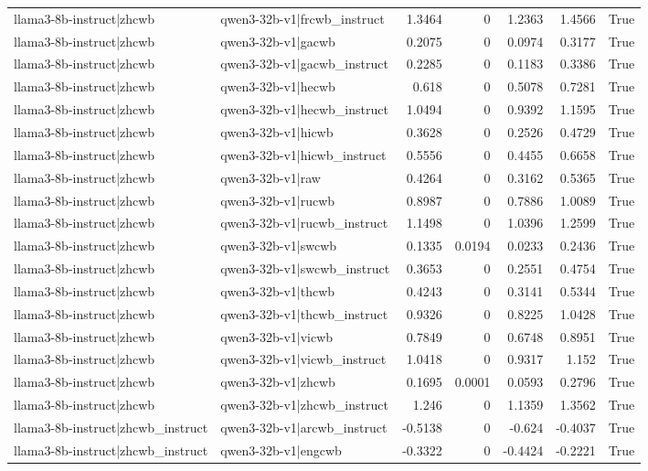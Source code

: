 \begin{table}
\begin{tabular}{l l r r r r l}
llama3-8b-instruct|zhcwb & qwen3-32b-v1|frcwb_instruct & 1.3464 & 0 & 1.2363 & 1.4566 & True \\
llama3-8b-instruct|zhcwb & qwen3-32b-v1|gacwb & 0.2075 & 0 & 0.0974 & 0.3177 & True \\
llama3-8b-instruct|zhcwb & qwen3-32b-v1|gacwb_instruct & 0.2285 & 0 & 0.1183 & 0.3386 & True \\
llama3-8b-instruct|zhcwb & qwen3-32b-v1|hecwb & 0.618 & 0 & 0.5078 & 0.7281 & True \\
llama3-8b-instruct|zhcwb & qwen3-32b-v1|hecwb_instruct & 1.0494 & 0 & 0.9392 & 1.1595 & True \\
llama3-8b-instruct|zhcwb & qwen3-32b-v1|hicwb & 0.3628 & 0 & 0.2526 & 0.4729 & True \\
llama3-8b-instruct|zhcwb & qwen3-32b-v1|hicwb_instruct & 0.5556 & 0 & 0.4455 & 0.6658 & True \\
llama3-8b-instruct|zhcwb & qwen3-32b-v1|raw & 0.4264 & 0 & 0.3162 & 0.5365 & True \\
llama3-8b-instruct|zhcwb & qwen3-32b-v1|rucwb & 0.8987 & 0 & 0.7886 & 1.0089 & True \\
llama3-8b-instruct|zhcwb & qwen3-32b-v1|rucwb_instruct & 1.1498 & 0 & 1.0396 & 1.2599 & True \\
llama3-8b-instruct|zhcwb & qwen3-32b-v1|swcwb & 0.1335 & 0.0194 & 0.0233 & 0.2436 & True \\
llama3-8b-instruct|zhcwb & qwen3-32b-v1|swcwb_instruct & 0.3653 & 0 & 0.2551 & 0.4754 & True \\
llama3-8b-instruct|zhcwb & qwen3-32b-v1|thcwb & 0.4243 & 0 & 0.3141 & 0.5344 & True \\
llama3-8b-instruct|zhcwb & qwen3-32b-v1|thcwb_instruct & 0.9326 & 0 & 0.8225 & 1.0428 & True \\
llama3-8b-instruct|zhcwb & qwen3-32b-v1|vicwb & 0.7849 & 0 & 0.6748 & 0.8951 & True \\
llama3-8b-instruct|zhcwb & qwen3-32b-v1|vicwb_instruct & 1.0418 & 0 & 0.9317 & 1.152 & True \\
llama3-8b-instruct|zhcwb & qwen3-32b-v1|zhcwb & 0.1695 & 0.0001 & 0.0593 & 0.2796 & True \\
llama3-8b-instruct|zhcwb & qwen3-32b-v1|zhcwb_instruct & 1.246 & 0 & 1.1359 & 1.3562 & True \\
llama3-8b-instruct|zhcwb_instruct & qwen3-32b-v1|arcwb_instruct & -0.5138 & 0 & -0.624 & -0.4037 & True \\
llama3-8b-instruct|zhcwb_instruct & qwen3-32b-v1|engcwb & -0.3322 & 0 & -0.4424 & -0.2221 & True \\

\end{tabular}
\end{table}
